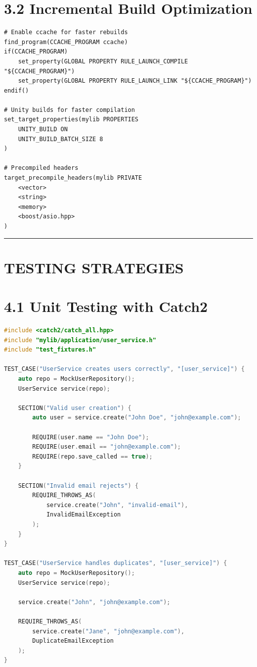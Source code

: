 \hypertarget{incremental-build-optimization}{%
\section{3.2 Incremental Build
Optimization}\label{incremental-build-optimization}}

\begin{lstlisting}
# Enable ccache for faster rebuilds
find_program(CCACHE_PROGRAM ccache)
if(CCACHE_PROGRAM)
    set_property(GLOBAL PROPERTY RULE_LAUNCH_COMPILE "${CCACHE_PROGRAM}")
    set_property(GLOBAL PROPERTY RULE_LAUNCH_LINK "${CCACHE_PROGRAM}")
endif()

# Unity builds for faster compilation
set_target_properties(mylib PROPERTIES
    UNITY_BUILD ON
    UNITY_BUILD_BATCH_SIZE 8
)

# Precompiled headers
target_precompile_headers(mylib PRIVATE
    <vector>
    <string>
    <memory>
    <boost/asio.hpp>
)
\end{lstlisting}

\begin{center}\rule{0.5\linewidth}{0.5pt}\end{center}

\hypertarget{testing-strategies}{%
\section{TESTING STRATEGIES}\label{testing-strategies}}

\hypertarget{unit-testing-with-catch2}{%
\section{4.1 Unit Testing with Catch2}\label{unit-testing-with-catch2}}

\begin{lstlisting}[language={C++}]
#include <catch2/catch_all.hpp>
#include "mylib/application/user_service.h"
#include "test_fixtures.h"

TEST_CASE("UserService creates users correctly", "[user_service]") {
    auto repo = MockUserRepository();
    UserService service(repo);
    
    SECTION("Valid user creation") {
        auto user = service.create("John Doe", "john@example.com");
        
        REQUIRE(user.name == "John Doe");
        REQUIRE(user.email == "john@example.com");
        REQUIRE(repo.save_called == true);
    }
    
    SECTION("Invalid email rejects") {
        REQUIRE_THROWS_AS(
            service.create("John", "invalid-email"),
            InvalidEmailException
        );
    }
}

TEST_CASE("UserService handles duplicates", "[user_service]") {
    auto repo = MockUserRepository();
    UserService service(repo);
    
    service.create("John", "john@example.com");
    
    REQUIRE_THROWS_AS(
        service.create("Jane", "john@example.com"),
        DuplicateEmailException
    );
}
\end{lstlisting}


